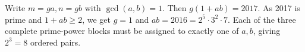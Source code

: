 Write $ m=ga,n=gb $ with $\gcd(a,b)=1 $. Then $ g(1+ab)=2017 $. As 2017 is prime and $ 1+ab\ge2 $, we get $ g=1 $ and $ ab=2016=2^5\cdot3^2\cdot7 $. Each of the three complete prime-power blocks must be assigned to exactly one of $ a,b $, giving $\boxed{2^3=8}$ ordered pairs.
